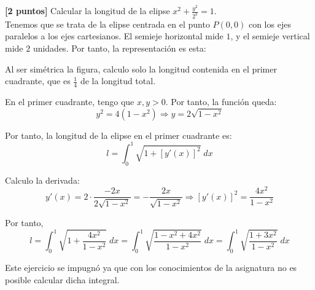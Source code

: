 \documentclass[12pt]{article}
\begin{document}
\begin{ejercicio}\textbf{[2 puntos]}
    Calcular la longitud de la elipse $\displaystyle x^2+\frac{y^2}{2^2}=1$.\\

    Tenemos que se trata de la elipse centrada en el punto $P(0,0)$ con los ejes paralelos a los ejes cartesianos. El semieje horizontal mide $1$, y el semieje vertical mide $2$ unidades. Por tanto, la representación es esta:
    \begin{figure}[H]
        \centering
        
    \end{figure}

    Al ser simétrica la figura, calculo solo la longitud contenida en el primer cuadrante, que es $\frac{1}{4}$ de la longitud total.

    En el primer cuadrante, tengo que $x,y>0$. Por tanto, la función queda:
    \begin{equation*}
        y^2 = 4(1-x^2) \Longrightarrow y=2\sqrt{1-x^2}
    \end{equation*}

    Por tanto, la longitud de la elipse en el primer cuadrante es:
    \begin{equation*}
        l=\int_0^1 \sqrt{1+[y'(x)]^2}\;dx
    \end{equation*}

    Calculo la derivada:
    \begin{equation*}
        y'(x)=2\cdot \frac{-2x}{2\sqrt{1-x^2}}= -\frac{2x}{\sqrt{1-x^2}} \Longrightarrow [y'(x)]^2 = \frac{4x^2}{1-x^2}
    \end{equation*}

    Por tanto,
    \begin{equation*}
        l=\int_0^1 \sqrt{1+\frac{4x^2}{1-x^2}}\;dx
        = \int_0^1 \sqrt{\frac{1-x^2 + 4x^2}{1-x^2}}\;dx
        = \int_0^1 \sqrt{\frac{1+3x^2}{1-x^2}}\;dx
    \end{equation*}

    \begin{observacion}
        Este ejercicio se impugnó ya que con los conocimientos de la asignatura no es posible calcular dicha integral.
    \end{observacion}
\end{ejercicio}
\end{document}
